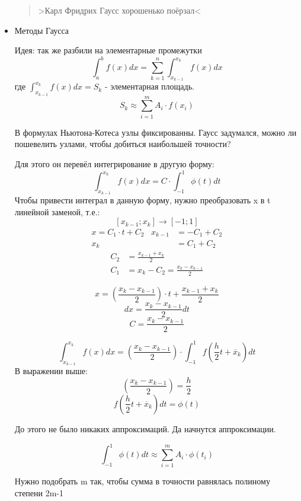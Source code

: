 \documentclass[12pt]{article}
\begin{document}
\begin{itemize}
        \begin{quotation}
          \centering
          >Карл Фридрих Гаусс хорошенько поёрзал<
        \end{quotation}
  \item Методы Гаусса
      
    Идея: так же разбили на элементарные промежутки
    \[
      \int_{a}^{b} f(x) dx = \sum_{k=1}^{n} \int_{x_{k-1}}^{x_k} f(x)dx
    \] 
    где \( \displaystyle\int_{x_{k-1}}^{x_k} f(x)dx = S_k \) - элементарная площадь.
    \[
      S_k \approx \sum_{i=1}^{m} A_i \cdot f(x_i)
    \] 

    В формулах Ньютона-Котеса узлы фиксированны. 
    Гаусс задумался, можно ли пошевелить узлами, чтобы добиться наибольшей
    точности?

    Для этого он перевёл интегрирование в другую форму:
    \[
      \int_{x_{k-1}}^{x_k} f(x)dx = C \cdot \int_{-1}^{1} \phi(t)dt
    \] 
    Чтобы привести интеграл в данную форму, нужно преобразовать x в t линейной
    заменой, т.е.:
    \[
      [x_{k-1}; x_k] \longrightarrow [-1; 1]
    \] 
    \begin{align*}
      x=C_1 \cdot t + C_2 \hspace{10pt} x_{k-1} &= -C_1 + C_2 \\
      x_k &= C_1 + C_2
    \end{align*}
    \begin{align*}
      C_2 &= \frac{x_{k-1} + x_k}{2} \\
      C_1 &= x_k - C_{2} = \frac{x_k - x_{k-1}}{2}
    \end{align*}

    \[
      x = \left( \frac{x_k - x_{k-1}}{2} \right) \cdot t
      + \frac{x_{k-1} + x_k}{2}
    \] 
    \[
      dx = \frac{x_k - x_{k-1}}{2}dt
    \] 
    \[
      C = \frac{x_k - x_{k-1}}{2}
    \]

    \[
      \int_{x_{k-1}}^{x_k} f(x)dx =
      \left( \frac{x_k - x_{k-1}}{2} \right) \cdot
      \int_{-1}^{1} f(\frac{h}{2} t + \overline{x}_k)dt
    \] 
    В выражении выше:
    \[
      \left( \frac{x_k - x_{k-1}}{2} \right) = \frac{h}{2}
    \] 
    \[
      f(\frac{h}{2} t + \overline{x}_k)dt = \phi(t)
    \] 
    
    До этого не было никаких аппроксимаций. Да начнутся аппроксимации.

    \[
      \int_{-1}^{1} \phi(t)dt \approx \sum_{i=1}^{m} A_i \cdot \phi(t_i)
    \] 

    Нужно подобрать m так, чтобы сумма в точности равнялась полиному
    степени 2m-1


\end{itemize}
\end{document}
